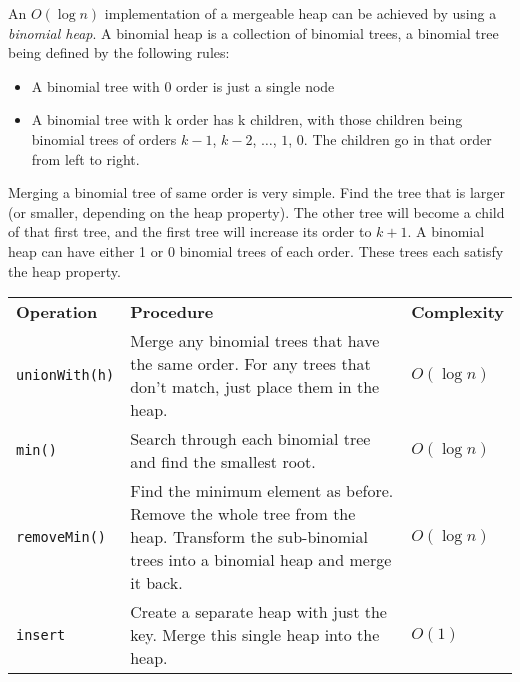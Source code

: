 An $O(\log n)$ implementation of a mergeable heap can be achieved by using a \textit{binomial heap}.  A binomial heap is a collection of binomial trees, a binomial tree being defined by the following rules:
\begin{itemize}
\item A binomial tree with 0 order is just a single node
\item A binomial tree with k order has k children, with those children being binomial trees of orders $k-1$, $k-2$, $\ldots$, $1$, $0$.  The children go in that order from left to right.
\end{itemize}
Merging a binomial tree of same order is very simple.  Find the tree that is larger (or smaller, depending on the heap property).  The other tree will become a child of that first tree, and the first tree will increase its order to $k+1$.
A binomial heap can have either 1 or 0 binomial trees of each order.  These trees each satisfy the heap property.
\newline\newline
\begin{tabular}{|lLl|}
  \hline
\textbf{Operation} & \textbf{Procedure} & \textbf{Complexity} \\
\texttt{unionWith(h)} & Merge any binomial trees that have the same order.  For any trees that don't match, just place them in the heap. & $O(\log n)$ \\\hline
\texttt{min()} & Search through each binomial tree and find the smallest  root. & $O(\log n)$ \\\hline
\texttt{removeMin()} & Find the minimum element as before.  Remove the whole tree from the heap. Transform the sub-binomial trees into a binomial heap and merge it back. & $O(\log n)$ \\\hline
\texttt{insert} & Create a separate heap with just the key.  Merge this single heap into the heap. & $O(1)$ \\\hline
\end{tabular}